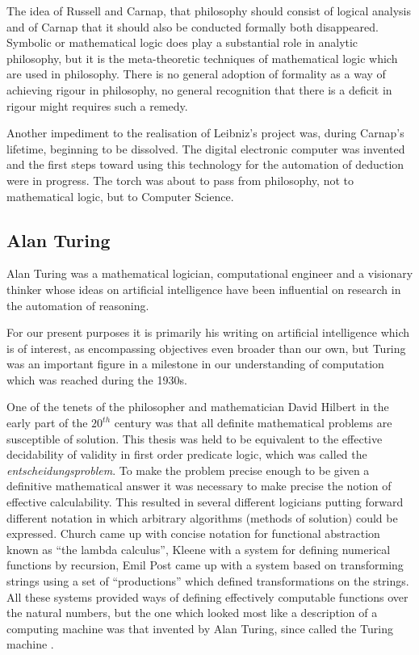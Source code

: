 The idea of Russell and Carnap, that philosophy should consist of logical analysis and of Carnap that it should also be conducted formally both disappeared.
Symbolic or mathematical logic does play a substantial role in analytic philosophy, but it is the meta-theoretic techniques of mathematical logic which are used in philosophy.
There is no general adoption of formality as a way of achieving rigour in philosophy, no general recognition that there is a deficit in rigour might requires such a remedy.

Another impediment to the realisation of Leibniz's project was, during Carnap's lifetime, beginning to be dissolved.
The digital electronic computer was invented and the first steps toward using this technology for the automation of deduction were in progress.
The torch was about to pass from philosophy, not to mathematical logic, but to Computer Science.

\subsection{Alan Turing}

Alan Turing was a mathematical logician, computational engineer and a visionary thinker whose ideas on artificial intelligence have been influential on research in the automation of reasoning.

For our present purposes it is primarily his writing on artificial intelligence which is of interest, as encompassing objectives even broader than our own, but Turing was an important figure in a milestone in our understanding of computation which was reached during the 1930s.

One of the tenets of the philosopher and mathematician David Hilbert in the early part of the $20^{th}$ century was that all definite mathematical problems are susceptible of solution.
This thesis was held to be equivalent to the effective decidability of validity in first order predicate logic, which was called the \emph{entscheidungsproblem}.
To make the problem precise enough to be given a definitive mathematical answer it was necessary to make precise the notion of effective calculability.
This resulted in several different logicians putting forward different notation in which arbitrary algorithms (methods of solution) could be expressed.
Church came up with concise notation for functional abstraction known as ``the lambda calculus'', Kleene with a system for defining numerical functions by recursion, Emil Post came up with a system based on transforming strings using a set of ``productions'' which defined transformations on the strings.
All these systems provided ways of defining effectively computable functions over the natural numbers, but the one which looked most like a description of a computing machine was that invented by Alan Turing, since called the Turing machine \cite{turingOCN}.

